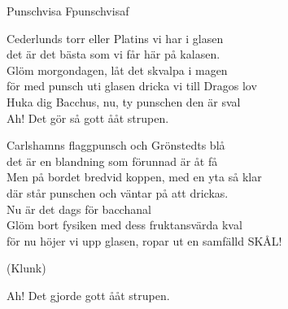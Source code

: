 \begin{song}{Punschvisa F}{punschvisaf}
\begin{vers}
Cederlunds torr eller Platins vi har i glasen\\
det är det bästa som vi får här på kalasen.\\
Glöm morgondagen, låt det skvalpa i magen\\
för med punsch uti glasen dricka vi till Dragos lov\\
Huka dig Bacchus, nu, ty punschen den är sval\\
Ah! Det gör så gott ååt strupen.
\end{vers}
\begin{vers}
Carlshamns flaggpunsch och Grönstedts blå\\
det är en blandning som förunnad är åt få \\
Men på bordet bredvid koppen, med en yta så klar\\
där står punschen och väntar på att drickas.\\
Nu är det dags för bacchanal\\
Glöm bort fysiken med dess fruktansvärda kval\\
för nu höjer vi upp glasen, ropar ut en samfälld SKÅL!\\
\end{vers}
\begin{vers}
(Klunk)
\end{vers}
\begin{vers}
Ah! Det gjorde gott ååt strupen.
\end{vers}
\end{song}
